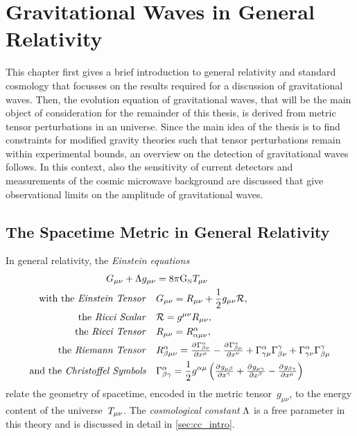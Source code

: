 \cleardoublepage
\chapter{Gravitational Waves in General Relativity}\label{ch:grav_waves}

This chapter first gives a brief introduction to general relativity and standard \FLRW{} cosmology that focusses on the results required for a discussion of gravitational waves. Then, the evolution equation of gravitational waves, that will be the main object of consideration for the remainder of this thesis, is derived from metric tensor perturbations in an \FLRW{} universe. Since the main idea of the thesis is to find constraints for modified gravity theories such that tensor perturbations remain within experimental bounds, an overview on the detection of gravitational waves follows. In this context, also the sensitivity of current detectors and measurements of the cosmic microwave background are discussed that give observational limits on the amplitude of gravitational waves.

\section{The Spacetime Metric in General Relativity}\label{sec:gr}

In general relativity, the \emph{Einstein equations}%
\begin{align}\label{eq:einstein_eqns}
	\Gtens_{\mu \nu} + \cosmconst g_{\mu\nu} &= 8 \pi \Newtconst \Ttens_{\mu \nu} \\
	\text{with the \emph{Einstein Tensor}} \quad &\Gtens_{\mu \nu} = \Rtens_{\mu \nu} + \frac{1}{2}g_{\mu \nu}\Rscal \eqpunct{,} \label{eq:einstein_tensor} \\
	\text{the \emph{Ricci Scalar}} \quad &\Rscal = g^{\mu \nu}\Rtens_{\mu \nu} \eqpunct{,} \\
	\text{the \emph{Ricci Tensor}} \quad &\Rtens_{\mu \nu} = \Riemtens^\alpha_{\alpha \mu \nu} \eqpunct{,} \\
	\text{the \emph{Riemann Tensor}} \quad &\Riemtens^\alpha_{\beta \mu \nu} = \pd{{\Gamma^\alpha_{\beta \nu}}}{{x^\mu}} - \pd{{\Gamma^\alpha_{\beta \mu}}}{{x^\nu}} + \Gamma^\alpha_{\gamma \mu}\Gamma^\gamma_{\beta \nu} + \Gamma^\alpha_{\gamma \nu}\Gamma^\gamma_{\beta \mu} \\
	\text{and the \emph{Christoffel Symbols}} \quad &\Gamma^\alpha_{\beta \gamma} = \frac{1}{2} g^{\alpha \mu} \del{\pd{{g_{\mu \beta}}}{{x^\gamma}} + \pd{{g_{\mu \gamma}}}{{x^\beta}} - \pd{{g_{\beta \gamma}}}{{x^\mu}}}
\end{align}
relate the geometry of spacetime, encoded in the metric tensor~\(g_{\mu \nu}\), to the energy content of the universe~\(T_{\mu \nu}\). The \emph{cosmological constant} \(\Lambda\) is a free parameter in this theory and is discussed in detail in \autoref{sec:cc_intro}.

